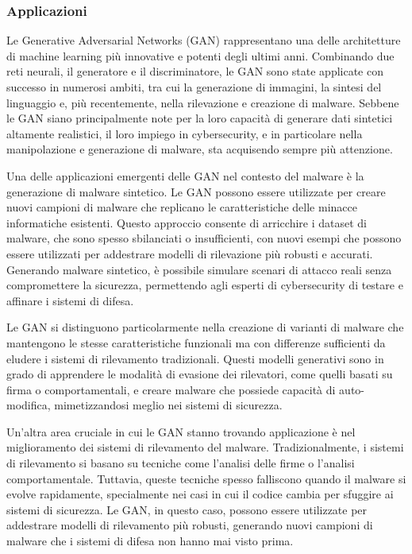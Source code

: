 \subsubsection{Applicazioni}
Le Generative Adversarial Networks (GAN) rappresentano una delle architetture di machine learning più innovative e potenti degli ultimi anni. Combinando due reti neurali, il generatore e il discriminatore, le GAN sono state applicate con successo in numerosi ambiti, tra cui la generazione di immagini, la sintesi del linguaggio e, più recentemente, nella rilevazione e creazione di malware. Sebbene le GAN siano principalmente note per la loro capacità di generare dati sintetici altamente realistici, il loro impiego in cybersecurity, e in particolare nella manipolazione e generazione di malware, sta acquisendo sempre più attenzione.


Una delle applicazioni emergenti delle GAN nel contesto del malware è la generazione di malware sintetico. Le GAN possono essere utilizzate per creare nuovi campioni di malware che replicano le caratteristiche delle minacce informatiche esistenti. Questo approccio consente di arricchire i dataset di malware, che sono spesso sbilanciati o insufficienti, con nuovi esempi che possono essere utilizzati per addestrare modelli di rilevazione più robusti e accurati. Generando malware sintetico, è possibile simulare scenari di attacco reali senza compromettere la sicurezza, permettendo agli esperti di cybersecurity di testare e affinare i sistemi di difesa.

Le GAN si distinguono particolarmente nella creazione di varianti di malware che mantengono le stesse caratteristiche funzionali ma con differenze sufficienti da eludere i sistemi di rilevamento tradizionali. Questi modelli generativi sono in grado di apprendere le modalità di evasione dei rilevatori, come quelli basati su firma o comportamentali, e creare malware che possiede capacità di auto-modifica, mimetizzandosi meglio nei sistemi di sicurezza.


Un'altra area cruciale in cui le GAN stanno trovando applicazione è nel miglioramento dei sistemi di rilevamento del malware. Tradizionalmente, i sistemi di rilevamento si basano su tecniche come l'analisi delle firme o l'analisi comportamentale. Tuttavia, queste tecniche spesso falliscono quando il malware si evolve rapidamente, specialmente nei casi in cui il codice cambia per sfuggire ai sistemi di sicurezza. Le GAN, in questo caso, possono essere utilizzate per addestrare modelli di rilevamento più robusti, generando nuovi campioni di malware che i sistemi di difesa non hanno mai visto prima.


